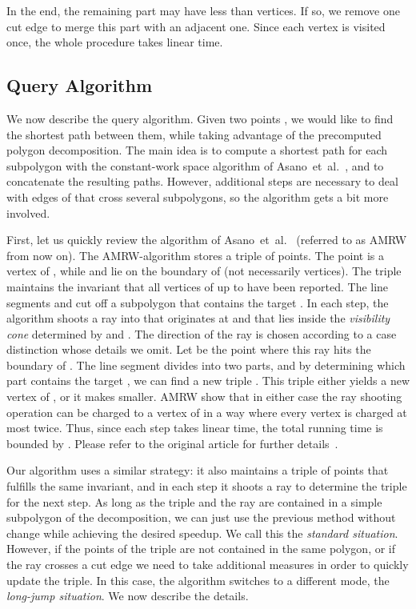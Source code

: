 \documentclass[11pt,a4paper]{article}
\newcommand{\etal}{et~al.}
\begin{document}
In the end, the remaining part may have less than  vertices. If so,
we remove one cut edge to merge this part with an adjacent one.
Since each vertex is visited once, the whole procedure takes linear time.


\subsection{Query Algorithm}
We now describe the query algorithm. Given two points ,
we would like to find the shortest path  between them,
while taking advantage of the precomputed polygon decomposition. The main idea
is to compute a shortest path for each subpolygon with the constant-work space
algorithm of Asano~\etal~\cite{AsanoMuRoWa11},
and to concatenate the resulting paths. However, additional steps are
necessary to deal with edges of  that cross several subpolygons,
so the algorithm gets a bit more involved.

First, let us quickly review the algorithm of
Asano~\etal~\cite{AsanoMuRoWa11} (referred to as AMRW from now on).
The AMRW-algorithm stores a triple  of points.
The point  is a vertex of , while  and  lie on
the boundary of  (not necessarily vertices). The triple maintains the invariant
that all vertices of  up to 
have been reported. The line segments  and  cut off a
subpolygon  that contains the target .
In each step, the algorithm shoots a ray into  that originates at  and
that lies inside the \emph{visibility cone} determined by  and .
The direction of the ray is chosen according to a case distinction
whose details we omit. Let  be the point where this ray hits
the boundary of . The line segment  divides
 into two parts, and by determining which part
contains the target , we can find a new
triple . This triple either yields a new vertex of ,
or it makes  smaller.
AMRW show that in either case the ray shooting operation can be
charged to a vertex of  in a way where every vertex is charged at most twice.
Thus, since each step takes linear time, the total
running time is bounded by . Please refer to
the original article for further details~\cite{AsanoMuRoWa11}.

Our algorithm uses a similar strategy: it also maintains a triple 
of points that fulfills the same invariant, and in each step it shoots a ray
to determine the triple for the next step. As long as the triple and the
ray are contained in a simple subpolygon of the decomposition, we can just
use the previous method without change while achieving the desired speedup.
We call this the \emph{standard situation}. However, if the points of the
triple are not contained in the same polygon, or if the ray crosses a cut edge
we need to take additional measures in order to quickly update the triple.
In this case, the algorithm switches to a different mode, the
\emph{long-jump situation}. We now describe the details.
\end{document}
